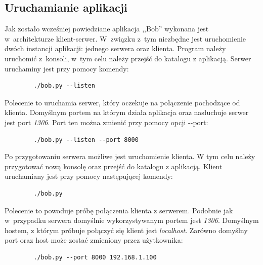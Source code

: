 \documentclass{article}
\begin{document}
  \subsection{Uruchamianie aplikacji}
    Jak zostało wcześniej powiedziane aplikacja ,,Bob'' wykonana jest w~architekturze klient-serwer. W~związku
    z~tym niezbędne jest uruchomienie dwóch instancji aplikacji: jednego serwera oraz klienta. Program należy
    uruchomić z~konsoli, w~tym celu należy przejść do katalogu z aplikacją. Serwer uruchaminy jest przy pomocy
    komendy:
      \begin{lstlisting}
        ./bob.py --listen
      \end{lstlisting}
    Polecenie to uruchamia serwer, który oczekuje na połączenie pochodzące od klienta. Domyślnym portem na którym
    działa aplikacja oraz nasłuchuje serwer jest port \emph{1306}. Port ten można zmienić przy pomocy opcji
    -{}-port:
      \begin{lstlisting}
        ./bob.py --listen --port 8000
      \end{lstlisting}
    Po przygotowaniu serwera możliwe jest uruchomienie klienta. W tym celu należy przygotować nową konsolę oraz
    przejść do katalogu z aplikacją. Klient uruchamiany jest przy pomocy następującej komendy:
      \begin{lstlisting}
        ./bob.py
      \end{lstlisting}
    Polecenie to powoduje próbę połączenia klienta z serwerem. Podobnie jak w~przypadku serwera domyślnie
    wykorzystywanym portem jest \emph{1306}. Domyślnym hostem, z którym próbuje połączyć się klient jest
    \emph{localhost}. Zarówno domyślny port oraz host może zostać zmieniony przez użytkownika:
      \begin{lstlisting}
        ./bob.py --port 8000 192.168.1.100
      \end{lstlisting}
\end{document}

